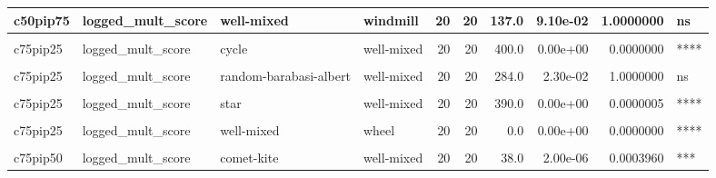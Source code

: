 \documentclass[
]{book}
\begin{document}
\begin{table}
\begin{tabular}{l|l|l|l|r|r|r|r|r|l}
\hline
c50pip75 & logged\_mult\_score & well-mixed & windmill & 20 & 20 & 137.0 & 9.10e-02 & 1.0000000 & ns\\
\hline
\cellcolor{gray!6}{c75pip25} & \cellcolor{gray!6}{logged\_mult\_score} & \cellcolor{gray!6}{comet-kite} & \cellcolor{gray!6}{well-mixed} & \cellcolor{gray!6}{20} & \cellcolor{gray!6}{20} & \cellcolor{gray!6}{397.0} & \cellcolor{gray!6}{0.00e+00} & \cellcolor{gray!6}{0.0000000} & \cellcolor{gray!6}{****}\\
\hline
c75pip25 & logged\_mult\_score & cycle & well-mixed & 20 & 20 & 400.0 & 0.00e+00 & 0.0000000 & ****\\
\hline
\cellcolor{gray!6}{c75pip25} & \cellcolor{gray!6}{logged\_mult\_score} & \cellcolor{gray!6}{linear-chain} & \cellcolor{gray!6}{well-mixed} & \cellcolor{gray!6}{20} & \cellcolor{gray!6}{20} & \cellcolor{gray!6}{398.0} & \cellcolor{gray!6}{0.00e+00} & \cellcolor{gray!6}{0.0000000} & \cellcolor{gray!6}{****}\\
\hline
c75pip25 & logged\_mult\_score & random-barabasi-albert & well-mixed & 20 & 20 & 284.0 & 2.30e-02 & 1.0000000 & ns\\
\hline
\cellcolor{gray!6}{c75pip25} & \cellcolor{gray!6}{logged\_mult\_score} & \cellcolor{gray!6}{random-waxman} & \cellcolor{gray!6}{well-mixed} & \cellcolor{gray!6}{20} & \cellcolor{gray!6}{20} & \cellcolor{gray!6}{390.0} & \cellcolor{gray!6}{0.00e+00} & \cellcolor{gray!6}{0.0000005} & \cellcolor{gray!6}{****}\\
\hline
c75pip25 & logged\_mult\_score & star & well-mixed & 20 & 20 & 390.0 & 0.00e+00 & 0.0000005 & ****\\
\hline
\cellcolor{gray!6}{c75pip25} & \cellcolor{gray!6}{logged\_mult\_score} & \cellcolor{gray!6}{toroidal-lattice} & \cellcolor{gray!6}{well-mixed} & \cellcolor{gray!6}{20} & \cellcolor{gray!6}{20} & \cellcolor{gray!6}{394.0} & \cellcolor{gray!6}{0.00e+00} & \cellcolor{gray!6}{0.0000001} & \cellcolor{gray!6}{****}\\
\hline
c75pip25 & logged\_mult\_score & well-mixed & wheel & 20 & 20 & 0.0 & 0.00e+00 & 0.0000000 & ****\\
\hline
\cellcolor{gray!6}{c75pip25} & \cellcolor{gray!6}{logged\_mult\_score} & \cellcolor{gray!6}{well-mixed} & \cellcolor{gray!6}{windmill} & \cellcolor{gray!6}{20} & \cellcolor{gray!6}{20} & \cellcolor{gray!6}{41.0} & \cellcolor{gray!6}{3.40e-06} & \cellcolor{gray!6}{0.0006486} & \cellcolor{gray!6}{***}\\
\hline
c75pip50 & logged\_mult\_score & comet-kite & well-mixed & 20 & 20 & 38.0 & 2.00e-06 & 0.0003960 & ***\\

\end{tabular}
\end{table}
\end{document}

